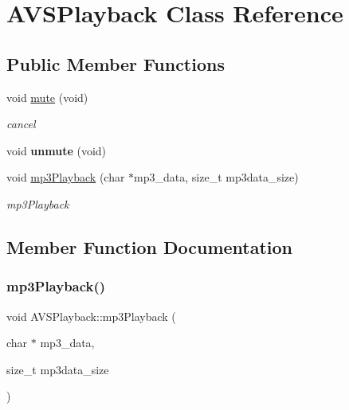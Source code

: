 \hypertarget{classAVSPlayback}{}\section{A\+V\+S\+Playback Class Reference}
\label{classAVSPlayback}
\subsection*{Public Member Functions}
\begin{DoxyCompactItemize}
\item 
void \hyperlink{classAVSPlayback_a2460eb0d8552541d3cc44fde4156147e}{mute} (void)
\begin{DoxyCompactList}\small\item\em cancel \end{DoxyCompactList}\item 
\mbox{\label{classAVSPlayback_ab5db8e18e9864da57915ce8d0c50199d}} 
void {\bfseries unmute} (void)
\item 
void \hyperlink{classAVSPlayback_a4696222c7fd236d08811c79f1d90def3}{mp3\+Playback} (char $\ast$mp3\+\_\+data, size\+\_\+t mp3data\+\_\+size)
\begin{DoxyCompactList}\small\item\em mp3\+Playback \end{DoxyCompactList}\end{DoxyCompactItemize}


\subsection{Member Function Documentation}
\mbox{\label{classAVSPlayback_a4696222c7fd236d08811c79f1d90def3}} 
\subsubsection{\texorpdfstring{mp3\+Playback()}{mp3Playback()}}
{\footnotesize\ttfamily void A\+V\+S\+Playback\+::mp3\+Playback (\begin{DoxyParamCaption}\item[{char $\ast$}]{mp3\+\_\+data,  }\item[{size\+\_\+t}]{mp3data\+\_\+size }\end{DoxyParamCaption})}




